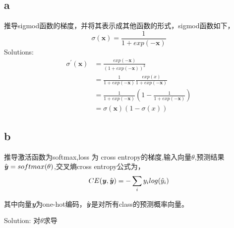 \documentclass[twoside,nofonts,fancyhdr,openany,UTF8,fleqn]{ctexart} %
\begin{document}
\subsection{a}
推导sigmod函数的梯度，并将其表示成其他函数的形式，sigmod函数如下，
\begin{equation}
 \sigma(\textbf{x}) = \frac{1}{1+exp(-\textbf{x})} 
\end{equation}
Solutions:
\begin{align}
\sigma^\prime(\textbf{x})  & = \frac{exp(-\textbf{x})}{(1+exp(-\textbf{x}))^2} \\
		& = \frac{1}{1+exp(-\textbf{x})}\frac{exp(x)}{1+exp(-\textbf{x})} \\
	& = \frac{1}{1+exp(-\textbf{x})}(1- \frac{1}{1+exp(-\textbf{x})})	\\
	& = \sigma(\textbf{x})(1-\sigma(x))
\end{align}

\subsection{b} 
推导激活函数为softmax,loss 为 cross entropy的梯度,输入向量$\theta$,预测结果$\hat{\textbf{\emph{y}}}=softmax(\theta)$,交叉熵cross entropy公式为，
\begin{equation}
CE(\textbf{\emph{y}}, \hat{\textbf{\emph{y}}}) = - \sum_{i}y_ilog(\hat{y}_i)
\end{equation}

其中向量\textbf{\emph{y}}为one-hot编码，$\hat{\textbf{\emph{y}}}$是对所有class的预测概率向量。

Solution:
对$\theta$求导
\end{document}
